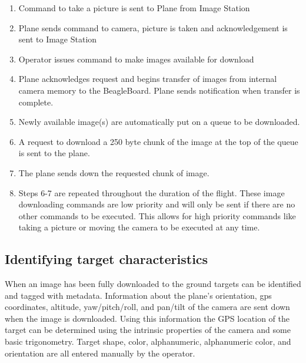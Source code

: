 \documentclass[10pt]{report}
\begin{document}
\begin{enumerate}
\item Command to take a picture is sent to Plane from Image Station
\item Plane sends command to camera, picture is taken and acknowledgement is sent to Image Station
\item Operator issues command to make images available for download
\item Plane acknowledges request and begins transfer of images from internal camera memory to the BeagleBoard.  Plane sends notification when transfer is complete.
\item Newly available image(s) are automatically put on a queue to be downloaded.
\item A request to download a 250 byte chunk of the image at the top of the queue is sent to the plane.
\item The plane sends down the requested chunk of image.
\item Steps 6-7 are repeated throughout the duration of the flight.  These image downloading commands are low priority and will only be sent if there are no other commands to be executed. This allows for high priority commands like taking a picture or moving the camera to be executed at any time.
\end{enumerate}

\subsection{Identifying target characteristics}

When an image has been fully downloaded to the ground targets can be identified and tagged with metadata.  Information about the plane's orientation, gps coordinates, altitude, yaw/pitch/roll, and pan/tilt of the camera are sent down when the image is downloaded.  Using this information the GPS location of the target can be determined using the intrinsic properties of the camera and some basic trigonometry. Target shape, color, alphanumeric, alphanumeric color, and orientation are all entered manually by the operator.
\end{document}
